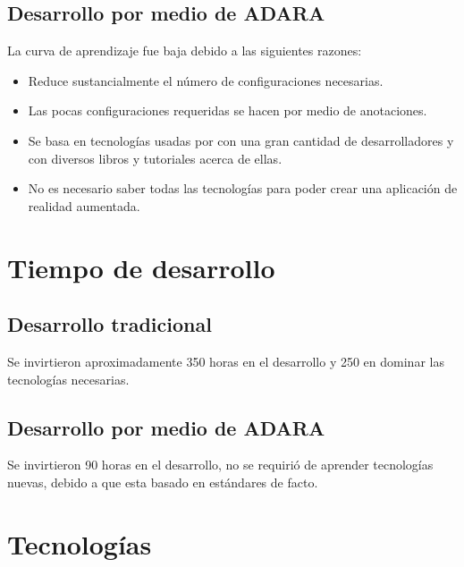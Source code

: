 \documentclass[12pt,a4paper,spanish,openany]{book}
\begin{document}
\subsection{Desarrollo por medio de ADARA}

La curva de aprendizaje fue baja debido a las siguientes razones:
\begin{itemize}
  \item Reduce sustancialmente el número de configuraciones necesarias.
  \item Las pocas configuraciones requeridas se hacen por medio de anotaciones.
  \item Se basa en tecnologías usadas por con una gran cantidad de
  desarrolladores y con diversos libros y tutoriales acerca de ellas.
  \item No es necesario saber todas las tecnologías para poder crear una
  aplicación de realidad aumentada.
\end{itemize}



\section{Tiempo de desarrollo}
\subsection{Desarrollo tradicional}
Se invirtieron aproximadamente 350 horas en el desarrollo y 250 en dominar las
tecnologías necesarias.
\subsection{Desarrollo por medio de ADARA}
Se invirtieron 90 horas en el desarrollo, no se requirió de aprender tecnologías
nuevas, debido a que esta basado en estándares de facto.

\section{Tecnologías}
\end{document}
